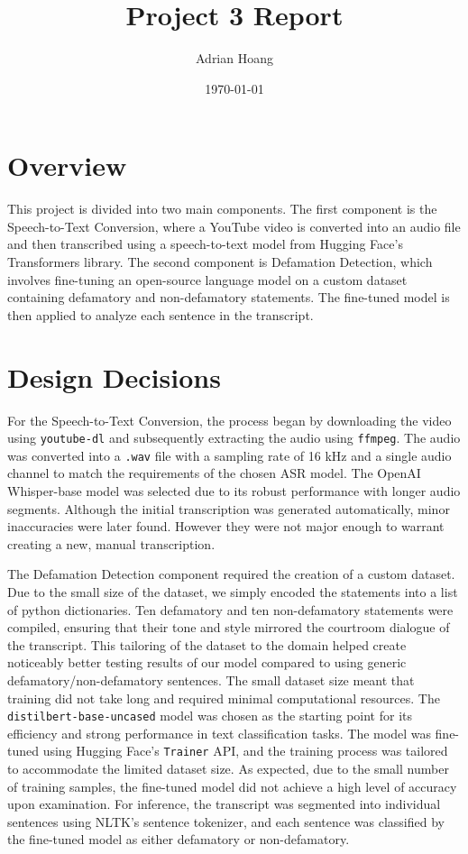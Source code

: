 \documentclass[12pt]{article}
\title{Project 3 Report}
\author{Adrian Hoang}
\date{\today}
\begin{document}
\maketitle

\section{Overview}
This project is divided into two main components. The first component is the Speech-to-Text Conversion, where a YouTube video is converted into an audio file and then transcribed using a speech-to-text model from Hugging Face's Transformers library. The second component is Defamation Detection, which involves fine-tuning an open-source language model on a custom dataset containing defamatory and non-defamatory statements. The fine-tuned model is then applied to analyze each sentence in the transcript.

\section{Design Decisions}
For the Speech-to-Text Conversion, the process began by downloading the video using \texttt{youtube-dl} and subsequently extracting the audio using \texttt{ffmpeg}. The audio was converted into a \texttt{.wav} file with a sampling rate of 16 kHz and a single audio channel to match the requirements of the chosen ASR model. The OpenAI Whisper-base model was selected due to its robust performance with longer audio segments. Although the initial transcription was generated automatically, minor inaccuracies were later found. However they were not major enough to warrant creating a new, manual transcription.

The Defamation Detection component required the creation of a custom dataset. Due to the small size of the dataset, we simply encoded the statements into a list of python dictionaries. Ten defamatory and ten non-defamatory statements were compiled, ensuring that their tone and style mirrored the courtroom dialogue of the transcript. This tailoring of the dataset to the domain helped create noticeably better testing results of our model compared to using generic defamatory/non-defamatory sentences. The small dataset size meant that training did not take long and required minimal computational resources. The \texttt{distilbert-base-uncased} model was chosen as the starting point for its efficiency and strong performance in text classification tasks. The model was fine-tuned using Hugging Face's \texttt{Trainer} API, and the training process was tailored to accommodate the limited dataset size. As expected, due to the small number of training samples, the fine-tuned model did not achieve a high level of accuracy upon examination. For inference, the transcript was segmented into individual sentences using NLTK's sentence tokenizer, and each sentence was classified by the fine-tuned model as either defamatory or non-defamatory.
\end{document}
